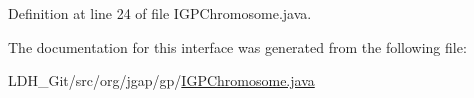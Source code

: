 Definition at line 24 of file I\-G\-P\-Chromosome.\-java.



The documentation for this interface was generated from the following file\-:\begin{DoxyCompactItemize}
\item 
L\-D\-H\-\_\-\-Git/src/org/jgap/gp/\hyperlink{_i_g_p_chromosome_8java}{I\-G\-P\-Chromosome.\-java}\end{DoxyCompactItemize}
